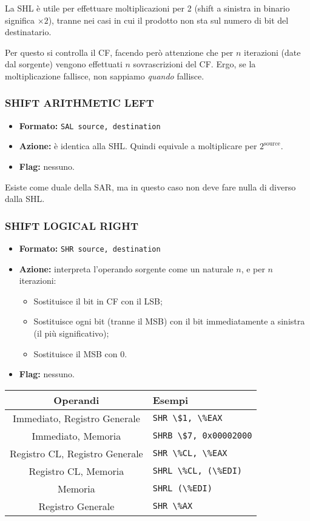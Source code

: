 \documentclass[a4paper,11pt]{article}
\begin{document}
La SHL è utile per effettuare moltiplicazioni per 2 (shift a sinistra in binario significa $\times 2$), tranne nei casi in cui il prodotto non sta sul numero di bit del destinatario.

Per questo si controlla il CF, facendo però attenzione che per $n$ iterazioni (date dal sorgente) vengono effettuati $n$ sovrascrizioni del CF.
Ergo, se la moltiplicazione fallisce, non sappiamo \textit{quando} fallisce.

\subsubsection{SHIFT ARITHMETIC LEFT}
\begin{itemize}
	\item \textbf{Formato:} \lstinline|SAL source, destination|
	\item \textbf{Azione:} è identica alla SHL. 
		Quindi equivale a moltiplicare per $2^\text{source}$.
	\item \textbf{Flag:} nessuno.
\end{itemize}

Esiste come duale della SAR, ma in questo caso non deve fare nulla di diverso dalla SHL.

\subsubsection{SHIFT LOGICAL RIGHT}
\begin{itemize}
	\item \textbf{Formato:} \lstinline|SHR source, destination|
	\item \textbf{Azione:} interpreta l'operando sorgente come un naturale $n$, e per $n$ iterazioni:
		\begin{itemize}
			\item Sostituisce il bit in CF con il LSB;
			\item Sostituisce ogni bit (tranne il MSB) con il bit immediatamente a sinistra (il più significativo);
			\item Sostituisce il MSB con 0.
		\end{itemize}
	\item \textbf{Flag:} nessuno.
\end{itemize}

		\begin{table}[H]
		\center {}
			\begin{tabular} { c | p{5cm} }
				\bfseries Operandi & \bfseries Esempi \\
				\hline
				Immediato, Registro Generale & \lstinline|SHR \$1, \%EAX| \\
				Immediato, Memoria & \lstinline|SHRB \$7, 0x00002000| \\
				Registro CL, Registro Generale & \lstinline|SHR \%CL, \%EAX| \\
				Registro CL, Memoria & \lstinline|SHRL \%CL, (\%EDI)| \\
				Memoria & \lstinline|SHRL (\%EDI)| \\ 
				Registro Generale & \lstinline|SHR \%AX|
			\end{tabular}
		\end{table}
\end{document}
